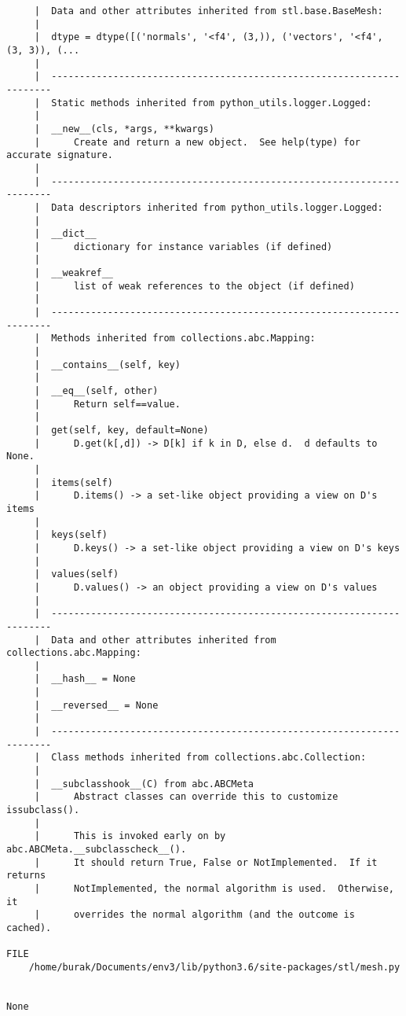 \documentclass[12pt,fleqn]{article}\usepackage{../../common}
\begin{document}
\begin{verbatim}
     |  Data and other attributes inherited from stl.base.BaseMesh:
     |  
     |  dtype = dtype([('normals', '<f4', (3,)), ('vectors', '<f4', (3, 3)), (...
     |  
     |  ----------------------------------------------------------------------
     |  Static methods inherited from python_utils.logger.Logged:
     |  
     |  __new__(cls, *args, **kwargs)
     |      Create and return a new object.  See help(type) for accurate signature.
     |  
     |  ----------------------------------------------------------------------
     |  Data descriptors inherited from python_utils.logger.Logged:
     |  
     |  __dict__
     |      dictionary for instance variables (if defined)
     |  
     |  __weakref__
     |      list of weak references to the object (if defined)
     |  
     |  ----------------------------------------------------------------------
     |  Methods inherited from collections.abc.Mapping:
     |  
     |  __contains__(self, key)
     |  
     |  __eq__(self, other)
     |      Return self==value.
     |  
     |  get(self, key, default=None)
     |      D.get(k[,d]) -> D[k] if k in D, else d.  d defaults to None.
     |  
     |  items(self)
     |      D.items() -> a set-like object providing a view on D's items
     |  
     |  keys(self)
     |      D.keys() -> a set-like object providing a view on D's keys
     |  
     |  values(self)
     |      D.values() -> an object providing a view on D's values
     |  
     |  ----------------------------------------------------------------------
     |  Data and other attributes inherited from collections.abc.Mapping:
     |  
     |  __hash__ = None
     |  
     |  __reversed__ = None
     |  
     |  ----------------------------------------------------------------------
     |  Class methods inherited from collections.abc.Collection:
     |  
     |  __subclasshook__(C) from abc.ABCMeta
     |      Abstract classes can override this to customize issubclass().
     |      
     |      This is invoked early on by abc.ABCMeta.__subclasscheck__().
     |      It should return True, False or NotImplemented.  If it returns
     |      NotImplemented, the normal algorithm is used.  Otherwise, it
     |      overrides the normal algorithm (and the outcome is cached).

FILE
    /home/burak/Documents/env3/lib/python3.6/site-packages/stl/mesh.py


None
\end{verbatim}
\end{document}
